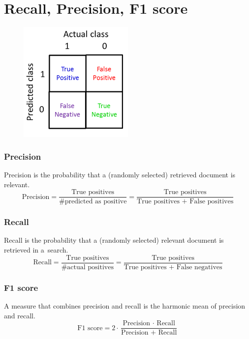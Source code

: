 \documentclass[12pt, a4paper]{article}
\begin{document}
\newpage

\section{Recall, Precision, F1 score}
\par{}

\begin{figure}[!ht]
	\centering
	\includegraphics[width = 0.5\textwidth]{Tabulka.png}
\end{figure}


\subsubsection*{Precision}
Precision is the probability that a (randomly selected) retrieved document is relevant.
\begin{equation}
	\mbox{Precision} = \frac{\mbox{True positives}}{\# \mbox{predicted as positive}} = \frac{\mbox{True positives}}{\mbox{True positives + False positives}}
\end{equation}

\subsubsection*{Recall}
Recall is the probability that a (randomly selected) relevant document is retrieved in a~search.
\begin{equation}
	\mbox{Recall} = \frac{\mbox{True positives}}{\# \mbox{actual positives}} = \frac{\mbox{True positives}}{\mbox{True positives + False negatives}}
\end{equation}

\subsubsection*{F1 score}
A measure that combines precision and recall is the harmonic mean of precision and recall.
\begin{equation}
	\mbox{F1 score} = 2 \cdot \frac{\mbox{Precision $\cdot$ Recall}}{\mbox{Precision + Recall}}
\end{equation}
\end{document}
